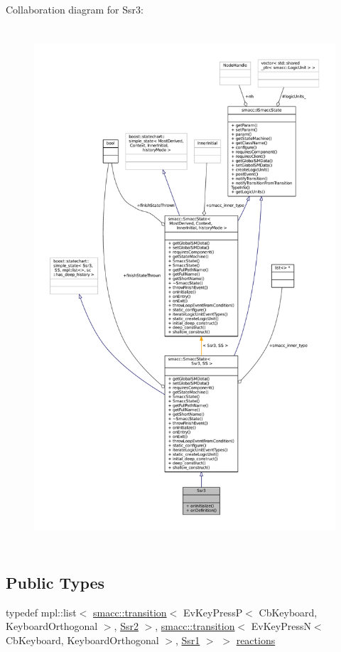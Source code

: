 Collaboration diagram for Ssr3\+:
\nopagebreak
\begin{figure}[H]
\begin{center}
\leavevmode
\includegraphics[height=550pt]{structSsr3__coll__graph}
\end{center}
\end{figure}
\subsection*{Public Types}
\begin{DoxyCompactItemize}
\item 
typedef mpl\+::list$<$ \hyperlink{classsmacc_1_1transition}{smacc\+::transition}$<$ Ev\+Key\+PressP$<$ Cb\+Keyboard, Keyboard\+Orthogonal $>$, \hyperlink{structSsr2}{Ssr2} $>$, \hyperlink{classsmacc_1_1transition}{smacc\+::transition}$<$ Ev\+Key\+PressN$<$ Cb\+Keyboard, Keyboard\+Orthogonal $>$, \hyperlink{structSsr1}{Ssr1} $>$ $>$ \hyperlink{structSsr3_a93a31de201b27c1ed5b9d20c57d56d62}{reactions}
\end{DoxyCompactItemize}
